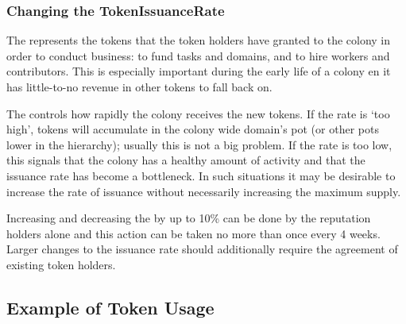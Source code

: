 
\subsubsection{Changing the TokenIssuanceRate}
The  represents the tokens that the token holders have granted to the colony in order to conduct business: to fund tasks and domains, and to hire workers and contributors. This is especially important during the early life of a colony en it has little-to-no revenue in other tokens to fall back on.

The  controls how rapidly the colony receives the new tokens. If the rate is `too high', tokens will accumulate in the colony wide domain's pot (or other pots lower in the hierarchy); usually this is not a big problem. If the rate is too low, this signals that the colony has a healthy amount of activity and that the issuance rate has become a bottleneck. In such situations it may be desirable to increase the rate of issuance without necessarily increasing the maximum supply.

Increasing and decreasing the  by up to 10\% can be done by the reputation holders alone and this action can be taken no more than once every 4 weeks. Larger changes to the issuance rate should additionally require the agreement of existing token holders.


\subsection{Example of Token Usage}\label{sec:colony-token-examples}
